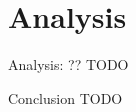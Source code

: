 \section{Analysis}

\begin{frame}{Analysis: ??}
TODO
\end{frame}

\begin{frame}{Conclusion}
TODO
\end{frame}
